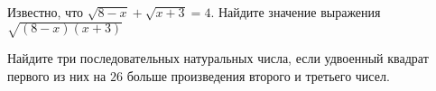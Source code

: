 \begin{listofex}
	\item Известно, что \( \sqrt{8-x}+\sqrt{x+3}=4 \). Найдите значение выражения \( \sqrt{(8-x)(x+3)} \)
	
	\item Найдите три последовательных натуральных числа, если удвоенный квадрат
	первого из них на \( 26 \) больше произведения второго и третьего чисел.
\end{listofex}
